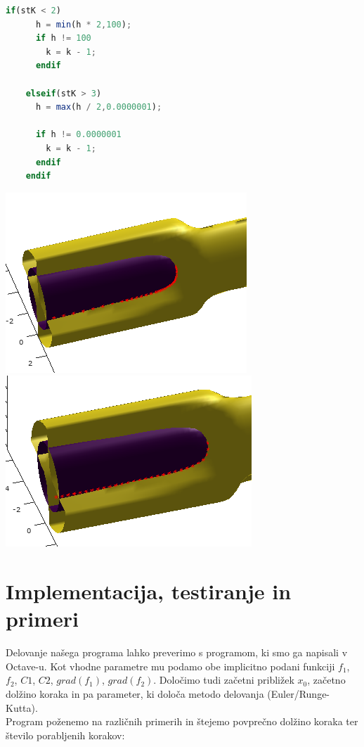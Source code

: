 \documentclass[12pt]{article}
\begin{document}
	\begin{lstlisting}[language=Octave]
	if(stK < 2) 
      h = min(h * 2,100);
      if h != 100
        k = k - 1; 
      endif
      
    elseif(stK > 3)
      h = max(h / 2,0.0000001);
      
      if h != 0.0000001
        k = k - 1;
      endif
    endif
	\end{lstlisting}
	
	\includegraphics[scale=0.7]{slikaAda}
	\includegraphics[scale=0.7]{slikaAda2}			
\section{Implementacija, testiranje in primeri}
	Delovanje našega programa lahko preverimo s programom, ki smo ga napisali v Octave-u. Kot vhodne parametre mu podamo obe implicitno podani funkciji $f_{1}$, $f_{2}$, $C1$, $C2$, $grad(f_{1})$, $grad(f_{2})$. Določimo tudi začetni približek $x_{0}$, začetno dolžino koraka in pa parameter, ki določa metodo delovanja (Euler/Runge-Kutta).\\
	Program poženemo na različnih primerih in štejemo povprečno dolžino koraka ter število porabljenih korakov:\\\\
		
\end{document}
